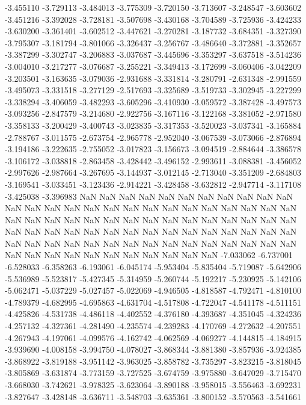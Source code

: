 -3.455110
-3.729113
-3.484013
-3.775309
-3.720150
-3.713607
-3.248547
-3.603602
-3.451216
-3.392028
-3.728181
-3.507698
-3.430168
-3.704589
-3.725936
-3.424233
-3.630200
-3.361401
-3.602512
-3.447621
-3.270281
-3.187732
-3.684351
-3.327390
-3.795307
-3.181794
-3.801066
-3.326437
-3.256767
-3.486640
-3.372881
-3.352657
-3.387299
-3.302747
-3.206883
-3.037687
-3.445696
-3.353297
-3.637518
-3.514236
-3.004010
-3.217277
-3.076687
-3.255221
-3.349413
-3.172699
-3.060406
-3.042209
-3.203501
-3.163635
-3.079036
-2.931688
-3.331814
-3.280791
-2.631348
-2.991559
-3.495073
-3.331518
-3.277129
-2.517693
-3.325689
-3.519733
-3.302945
-3.227299
-3.338294
-3.406059
-3.482293
-3.605296
-3.410930
-3.059572
-3.387428
-3.497573
-3.093256
-2.847579
-3.214680
-2.922756
-3.167116
-3.122168
-3.381052
-2.971580
-3.358133
-3.200429
-3.400743
-3.023835
-3.317353
-3.520023
-3.037341
-3.165884
-2.788767
-3.011575
-2.673754
-2.965778
-2.952040
-3.067539
-3.073066
-2.876894
-3.194186
-3.222635
-2.755052
-3.017823
-3.156673
-3.094519
-2.884644
-3.386578
-3.106172
-3.038818
-2.863458
-3.428442
-3.496152
-2.993611
-3.088381
-3.456052
-2.997626
-2.987664
-3.267695
-3.144937
-3.012145
-2.713040
-3.351209
-2.684803
-3.169541
-3.033451
-3.123436
-2.914221
-3.428458
-3.632812
-2.947714
-3.117108
-3.425038
-3.396983
NaN
NaN
NaN
NaN
NaN
NaN
NaN
NaN
NaN
NaN
NaN
NaN
NaN
NaN
NaN
NaN
NaN
NaN
NaN
NaN
NaN
NaN
NaN
NaN
NaN
NaN
NaN
NaN
NaN
NaN
NaN
NaN
NaN
NaN
NaN
NaN
NaN
NaN
NaN
NaN
NaN
NaN
NaN
NaN
NaN
NaN
NaN
NaN
NaN
NaN
NaN
NaN
NaN
NaN
NaN
NaN
NaN
NaN
NaN
NaN
NaN
NaN
NaN
NaN
NaN
NaN
NaN
NaN
NaN
NaN
NaN
NaN
NaN
NaN
NaN
NaN
NaN
NaN
NaN
NaN
NaN
NaN
-7.033062
-6.737001
-6.528033
-6.358263
-6.193061
-6.045174
-5.953404
-5.835404
-5.719087
-5.642906
-5.536989
-5.523817
-5.427345
-5.314959
-5.260744
-5.192217
-5.230925
-5.142106
-5.062471
-5.037229
-5.027457
-5.022069
-4.946505
-4.818587
-4.792471
-4.810100
-4.789379
-4.682995
-4.695863
-4.631704
-4.517808
-4.722047
-4.541178
-4.511151
-4.425826
-4.531738
-4.486118
-4.402552
-4.376180
-4.393687
-4.351045
-4.324236
-4.257132
-4.327361
-4.281490
-4.235574
-4.239283
-4.170769
-4.272632
-4.207551
-4.267943
-4.197061
-4.099576
-4.162742
-4.062569
-4.069277
-4.144815
-4.184915
-3.939690
-4.008158
-3.994750
-4.078027
-3.868344
-3.881380
-3.857936
-3.924385
-3.868922
-3.819188
-3.951142
-3.963025
-3.858782
-3.735297
-3.823215
-3.818045
-3.805869
-3.631874
-3.773159
-3.727525
-3.674759
-3.975880
-3.647029
-3.715470
-3.668030
-3.742621
-3.978325
-3.623064
-3.890188
-3.958015
-3.556463
-3.692231
-3.827647
-3.428148
-3.636711
-3.548703
-3.635361
-3.800152
-3.570563
-3.541661
